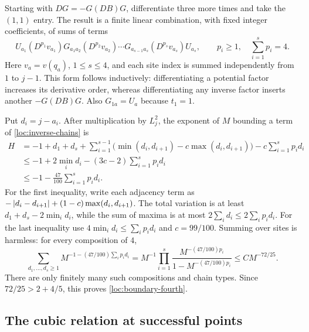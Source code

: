 Starting with $DG=-G(DB)G$, differentiate three more times and take
the $(1,1)$ entry. The result is a finite linear combination, with
fixed integer coefficients, of sums of terms
\begin{equation}
 U_{a_1}(D^{p_1}v_{a_1})G_{a_1a_2}
 (D^{p_2}v_{a_2})\cdots
 G_{a_{s-1}a_s}(D^{p_s}v_{a_s})U_{a_s},
 \qquad p_i\ge1,\quad \sum_{i=1}^{s}p_i=4.
 \label{loc:inverse-chains}
\end{equation}
Here $v_a=v(q_a)$, $1\le s\le4$, and each site index is summed
independently from $1$ to $j-1$. This form follows inductively:
differentiating a potential factor increases its derivative order,
whereas differentiating any inverse factor inserts another
$-G(DB)G$. Also $G_{1a}=U_a$ because $t_1=1$.

Put $d_i=j-a_i$. After multiplication by $L_j^2$, the exponent of
$M$ bounding a term of \cref{loc:inverse-chains} is
\begin{align*}
 H&=-1+d_1+d_s+
 \sum_{i=1}^{s-1}\bigl(\min(d_i,d_{i+1})-c\max(d_i,d_{i+1})\bigr)
       -c\sum_{i=1}^{s}p_id_i\\
 &\le -1+2\min_i d_i-(3c-2)\sum_{i=1}^{s}p_id_i\\
 &\le -1-\frac{47}{100}\sum_{i=1}^{s}p_id_i.
\end{align*}
For the first inequality, write each adjacency term as
$-\left\lvert d_i-d_{i+1}\right\rvert+(1-c)\max(d_i,d_{i+1})$. The total variation
is at least $d_1+d_s-2\min_i d_i$, while the sum of maxima is at
most $2\sum_i d_i\le2\sum_i p_id_i$. For the last inequality use
$4\min_i d_i\le\sum_i p_id_i$ and $c=99/100$.
Summing over sites is harmless: for every composition of $4$,
\[
 \sum_{d_1,\ldots,d_s\ge1}
 M^{-1-(47/100)\sum_i p_id_i}
 =M^{-1}\prod_{i=1}^{s}
 \frac{M^{-(47/100)p_i}}{1-M^{-(47/100)p_i}}
 \le C M^{-72/25}.
\]
There are only finitely many such compositions and chain types.
Since $72/25>2+4/5$, this proves \cref{loc:boundary-fourth}.

\subsection{The cubic relation at successful points}

